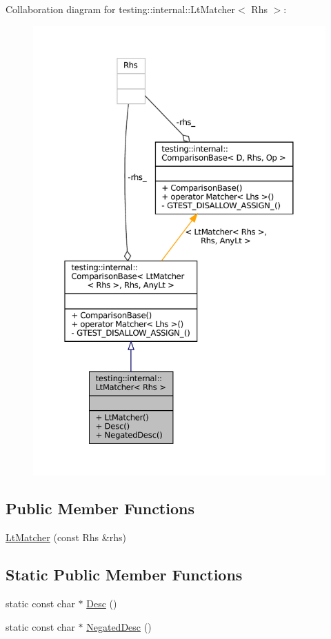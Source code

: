 Collaboration diagram for testing\+:\+:internal\+:\+:Lt\+Matcher$<$ Rhs $>$\+:
\nopagebreak
\begin{figure}[H]
\begin{center}
\leavevmode
\includegraphics[width=350pt]{classtesting_1_1internal_1_1LtMatcher__coll__graph}
\end{center}
\end{figure}
\subsection*{Public Member Functions}
\begin{DoxyCompactItemize}
\item 
\hyperlink{classtesting_1_1internal_1_1LtMatcher_af5275d78fc5499e4757f1b3ecca67e15}{Lt\+Matcher} (const Rhs \&rhs)
\end{DoxyCompactItemize}
\subsection*{Static Public Member Functions}
\begin{DoxyCompactItemize}
\item 
static const char $\ast$ \hyperlink{classtesting_1_1internal_1_1LtMatcher_aeb101aafbf1c074ccbb3df1496487746}{Desc} ()
\item 
static const char $\ast$ \hyperlink{classtesting_1_1internal_1_1LtMatcher_ab62db503e9e0293b4a2d22a96c140b10}{Negated\+Desc} ()
\end{DoxyCompactItemize}


